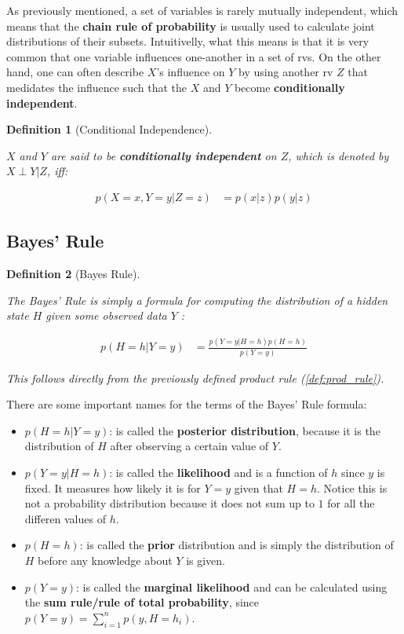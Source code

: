 \documentclass{article}
\newtheorem{definition}{Definition}[section]
\begin{document}
As previously mentioned, a set of variables is rarely mutually independent, which means that the \textbf{chain rule of probability} is usually used to calculate joint distributions of their subsets. Intuitivelly, what this means is that it is very common that one variable influences one-another in a set of rvs. On the other hand, one can often describe $X$'s influence on $Y$ by using another rv $Z$ that medidates the influence such that the $X$ and $Y$  become \textbf{conditionally independent}.

\begin{definition}[Conditional Independence]
	\label{def:cond_indep}
	
	$X$ and $Y$ are said to be \textbf{conditionally independent} on $Z$, which is denoted by $X \perp Y | Z$, iff:
	
	\begin{align}
		p(X = x, Y=y | Z = z) &= p(x | z) p(y | z)
	\end{align}
	
\end{definition}


\subsection{Bayes' Rule}


\begin{definition}[Bayes Rule]
	\label{def:bayes_rule}
	
	The Bayes' Rule is simply a formula for computing the distribution of a hidden state $H$ given some observed data $Y$ :
	
	\begin{align}
		p(H = h | Y = y) &= \frac{p(Y = y | H = h) p(H = h)}{p(Y=y)}
	\end{align}
	
	This follows directly from the previously defined product rule (\ref{def:prod_rule}).
	
\end{definition}

There are some important names for the terms of the Bayes' Rule formula:

\begin{itemize}
	\item $p(H = h | Y = y)$:  is called the \textbf{posterior distribution}, because it is the distribution of $H$ after observing a certain value of $Y$.
	\item $p(Y = y | H = h)$: is called the \textbf{likelihood} and is a function of $h$ since $y$ is fixed. It measures how likely it is for $Y = y$ given that $H = h$. Notice this is not a probability distribution because it does not sum up to $1$ for all the differen values of $h$.
	\item $p(H = h)$: is called the \textbf{prior} distribution and is simply the distribution of $H$ before any knowledge about $Y$ is given.
	\item $p(Y = y)$: is called the \textbf{marginal likelihood} and can be calculated using the \textbf{sum rule/rule of total probability}, since $p(Y = y) = \sum_{i = 1}^{n} p(y, H = h_i)$.
\end{itemize}
\end{document}
